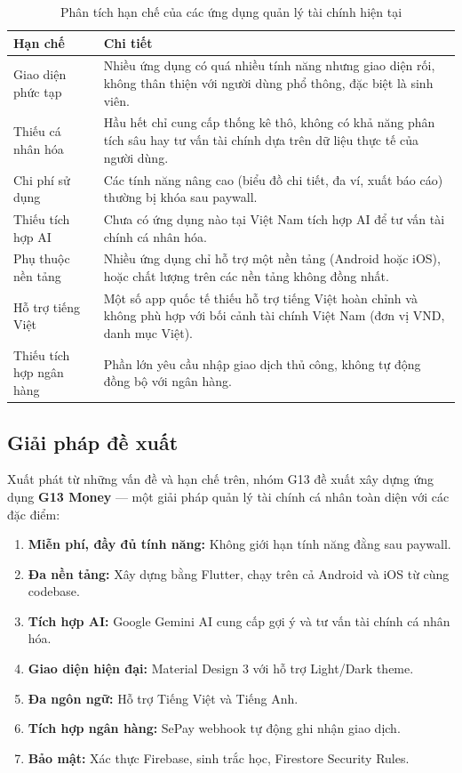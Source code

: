 \begin{table}[H]
\centering
\caption{Phân tích hạn chế của các ứng dụng quản lý tài chính hiện tại}
\label{tab:competitor-analysis}
\begin{tabularx}{\textwidth}{|l|X|}
\hline
\textbf{Hạn chế} & \textbf{Chi tiết} \\
\hline
Giao diện phức tạp & Nhiều ứng dụng có quá nhiều tính năng nhưng giao diện rối, không thân thiện với người dùng phổ thông, đặc biệt là sinh viên. \\
\hline
Thiếu cá nhân hóa & Hầu hết chỉ cung cấp thống kê thô, không có khả năng phân tích sâu hay tư vấn tài chính dựa trên dữ liệu thực tế của người dùng. \\
\hline
Chi phí sử dụng & Các tính năng nâng cao (biểu đồ chi tiết, đa ví, xuất báo cáo) thường bị khóa sau paywall. \\
\hline
Thiếu tích hợp AI & Chưa có ứng dụng nào tại Việt Nam tích hợp AI để tư vấn tài chính cá nhân hóa. \\
\hline
Phụ thuộc nền tảng & Nhiều ứng dụng chỉ hỗ trợ một nền tảng (Android hoặc iOS), hoặc chất lượng trên các nền tảng không đồng nhất. \\
\hline
Hỗ trợ tiếng Việt & Một số app quốc tế thiếu hỗ trợ tiếng Việt hoàn chỉnh và không phù hợp với bối cảnh tài chính Việt Nam (đơn vị VND, danh mục Việt). \\
\hline
Thiếu tích hợp ngân hàng & Phần lớn yêu cầu nhập giao dịch thủ công, không tự động đồng bộ với ngân hàng. \\
\hline
\end{tabularx}
\end{table}

\subsection{Giải pháp đề xuất}

Xuất phát từ những vấn đề và hạn chế trên, nhóm G13 đề xuất xây dựng ứng dụng \textbf{G13 Money} --- một giải pháp quản lý tài chính cá nhân toàn diện với các đặc điểm:

\begin{enumerate}
  \item \textbf{Miễn phí, đầy đủ tính năng:} Không giới hạn tính năng đằng sau paywall.
  \item \textbf{Đa nền tảng:} Xây dựng bằng Flutter, chạy trên cả Android và iOS từ cùng codebase.
  \item \textbf{Tích hợp AI:} Google Gemini AI cung cấp gợi ý và tư vấn tài chính cá nhân hóa.
  \item \textbf{Giao diện hiện đại:} Material Design 3 với hỗ trợ Light/Dark theme.
  \item \textbf{Đa ngôn ngữ:} Hỗ trợ Tiếng Việt và Tiếng Anh.
  \item \textbf{Tích hợp ngân hàng:} SePay webhook tự động ghi nhận giao dịch.
  \item \textbf{Bảo mật:} Xác thực Firebase, sinh trắc học, Firestore Security Rules.
\end{enumerate}

